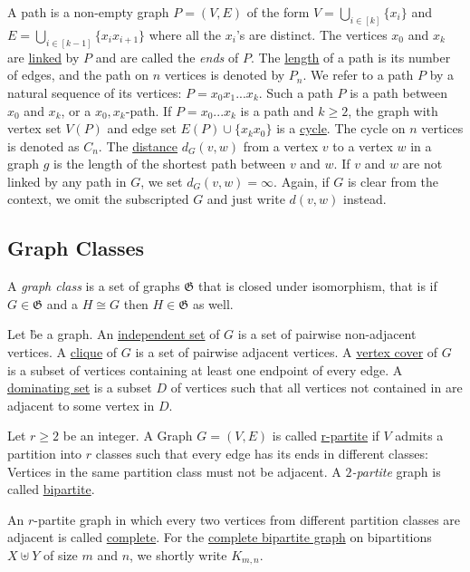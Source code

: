 \begin{definition}
    A path is a non-empty graph $P = (V,E)$ of the form $V = \bigcup_{i  \in [k]} \{x_i\}$ and $E = \bigcup_{i \in  [k-1]} \{x_ix_{i+1}\}$ where all the $x_i$'s are distinct. 
    The vertices $x_0$ and $x_k$ are \underline{linked} by $P$ and are called the \textit{ends} of $P$. The \underline{length} of a path is its number of edges, and the path on $n$ vertices is denoted by  $P_n$. 
    We refer to a path $P$ by a natural sequence of its vertices: $P = x_0x_1...x_k$. Such a path $P$ is a path between $x_0$ and $x_k$, or a $x_0,x_k$-path.
    If $P = x_0...x_k$ is a path and $k \geq 2$, the graph with vertex set $V(P)$ and edge set $E(P) \cup \{x_kx_0\}$ is a \underline{cycle}. The cycle on $n$ vertices is denoted as $C_n$.
    The \underline{distance} $d_G(v,w)$ from a vertex $v$ to a vertex $w$ in a graph $g$ is the length of the shortest path between $v$ and $w$. If $v$ and $w$ are not linked by any path in $G$, we set $d_G(v,w) = \infty$. Again, if $G$ is clear from the context, we omit the subscripted $G$ and just write $d(v,w)$ instead.
\end{definition}

\subsection{Graph Classes}

A \textit{graph class} is a set of graphs $\mathfrak{G}$ that is closed under isomorphism, that is if $G \in \mathfrak{G}$ and a $H \cong G$ then $H \in \mathfrak{G}$ as well.

\begin{definition}
Let \G be a graph.
An  \underline{independent set} of $G$ is a set of pairwise non-adjacent vertices. 
A \underline{clique} of $G$ is a set of pairwise adjacent vertices. 
A \underline{vertex cover} of $G$ is a subset of vertices containing at least one endpoint of every edge. 
A \underline{dominating set} is a subset $D$ of vertices such that all vertices not contained in are adjacent to some vertex in $D$.
\end{definition}

\begin{graphclass}[r-partite]
    Let $r \geq 2$ be an integer. A Graph $G = (V, E)$ is called \underline{r-partite} if $V$ admits a partition into $r$ classes such that every edge has its ends in different classes: Vertices in the same partition class must not be adjacent. 
    A \textit{$2$-partite} graph is called \underline{bipartite}. 
    
    An $r$-partite graph in which every two vertices from different partition classes are adjacent is called \underline{complete}. For the \underline{complete bipartite graph} on bipartitions $X \uplus Y$ of size $m$ and $n$, we shortly write $K_{m,n}$. 
\end{graphclass}

